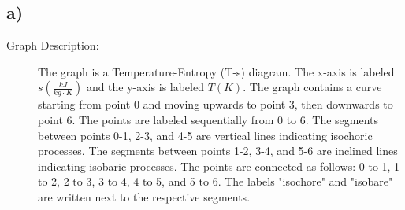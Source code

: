 

\subsection*{a)}

\begin{description}
    \item[Graph Description:] The graph is a Temperature-Entropy (T-s) diagram. The x-axis is labeled $s \left( \frac{kJ}{kg \cdot K} \right)$ and the y-axis is labeled $T \left( K \right)$. The graph contains a curve starting from point 0 and moving upwards to point 3, then downwards to point 6. The points are labeled sequentially from 0 to 6. The segments between points 0-1, 2-3, and 4-5 are vertical lines indicating isochoric processes. The segments between points 1-2, 3-4, and 5-6 are inclined lines indicating isobaric processes. The points are connected as follows: 0 to 1, 1 to 2, 2 to 3, 3 to 4, 4 to 5, and 5 to 6. The labels "isochore" and "isobare" are written next to the respective segments.
\end{description}